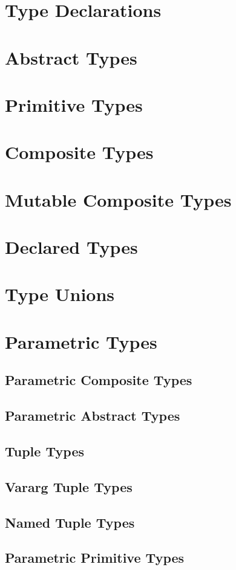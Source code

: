     \section{Type Declarations}
    \section{Abstract Types}
    \section{Primitive Types}
    \section{Composite Types}
    \section{Mutable Composite Types}
    \section{Declared Types}
    \section{Type Unions}
    \section{Parametric Types}
    \subsection{Parametric Composite Types}
    \subsection{Parametric Abstract Types}
    \subsection{Tuple Types}
    \subsection{Vararg Tuple Types}
    \subsection{Named Tuple Types}
    \subsection{Parametric Primitive Types}
